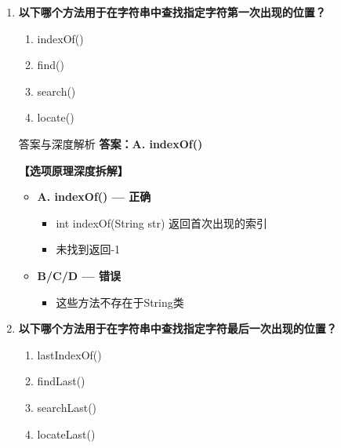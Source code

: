 \documentclass[12pt, a4paper]{ctexart}
\begin{document}
\begin{enumerate}[label=\textbf{\arabic*.}]
\begin{bluebox}{答案与深度解析}
\begin{itemize}[label={}, leftmargin=*, nosep]
\begin{itemize}[label={}, nosep]
	      
					  \end{itemize}
					  \end{itemize}
\end{bluebox}

	      \vspace{1em}

	\item \textbf{以下哪个方法用于在字符串中查找指定字符第一次出现的位置？}
	      \begin{enumerate}[label=\Alph*.]
		      \item indexOf()
		      \item find()
		      \item search()
		      \item locate()
	      \end{enumerate}

	      \begin{bluebox}{答案与深度解析}
		      \textbf{答案：A. indexOf()}

		      \textbf{【选项原理深度拆解】}
					  \begin{itemize}[label={}, leftmargin=*, nosep]


		      \item \textbf{A. indexOf() — 正确}
					  \begin{itemize}[label={}, nosep]
		      
			      \item int indexOf(String str) 返回首次出现的索引
			      \item 未找到返回-1

					  \end{itemize}
		      \item \textbf{B/C/D — 错误}
					  \begin{itemize}[label={}, nosep]
		      
			      \item 这些方法不存在于String类
		      
		      

	      
					  \end{itemize}
					  \end{itemize}
\end{bluebox}

	      \vspace{1em}

	\item \textbf{以下哪个方法用于在字符串中查找指定字符最后一次出现的位置？}
	      \begin{enumerate}[label=\Alph*.]
		      \item lastIndexOf()
		      \item findLast()
		      \item searchLast()
		      \item locateLast()
	      \end{enumerate}


\end{enumerate}
\end{document}
